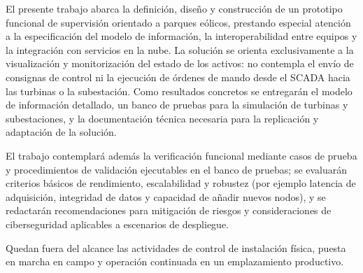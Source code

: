 El presente trabajo abarca la definición, diseño y construcción de un prototipo funcional de supervisión orientado a parques eólicos, prestando especial atención a la especificación del modelo de información, la interoperabilidad entre equipos y la integración con servicios en la nube. La solución se orienta exclusivamente a la visualización y monitorización del estado de los activos: no contempla el envío de consignas de control ni la ejecución de órdenes de mando desde el SCADA hacia las turbinas o la subestación. Como resultados concretos se entregarán el modelo de información detallado, un banco de pruebas para la simulación de turbinas y subestaciones, y la documentación técnica necesaria para la replicación y adaptación de la solución.\par

El trabajo contemplará además la verificación funcional mediante casos de prueba y procedimientos de validación ejecutables en el banco de pruebas; se evaluarán criterios básicos de rendimiento, escalabilidad y robustez (por ejemplo latencia de adquisición, integridad de datos y capacidad de añadir nuevos nodos), y se redactarán recomendaciones para mitigación de riesgos y consideraciones de ciberseguridad aplicables a escenarios de despliegue.\par

Quedan fuera del alcance las actividades de control de instalación física, puesta en marcha en campo y operación continuada en un emplazamiento productivo.\par
